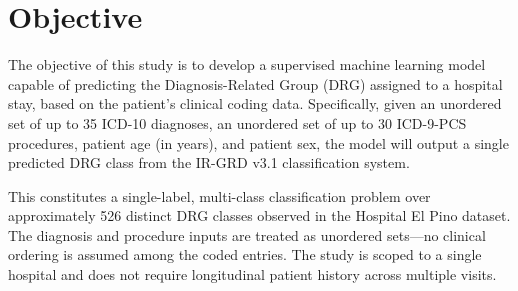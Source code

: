 \section{Objective}

The objective of this study is to develop a supervised machine learning model capable of predicting the Diagnosis-Related Group (DRG) assigned to a hospital stay, based on the patient's clinical coding data. Specifically, given an unordered set of up to 35 ICD-10 diagnoses, an unordered set of up to 30 ICD-9-PCS procedures, patient age (in years), and patient sex, the model will output a single predicted DRG class from the IR-GRD v3.1 classification system.

This constitutes a single-label, multi-class classification problem over approximately 526 distinct DRG classes observed in the Hospital El Pino dataset. The diagnosis and procedure inputs are treated as unordered sets---no clinical ordering is assumed among the coded entries. The study is scoped to a single hospital and does not require longitudinal patient history across multiple visits.
